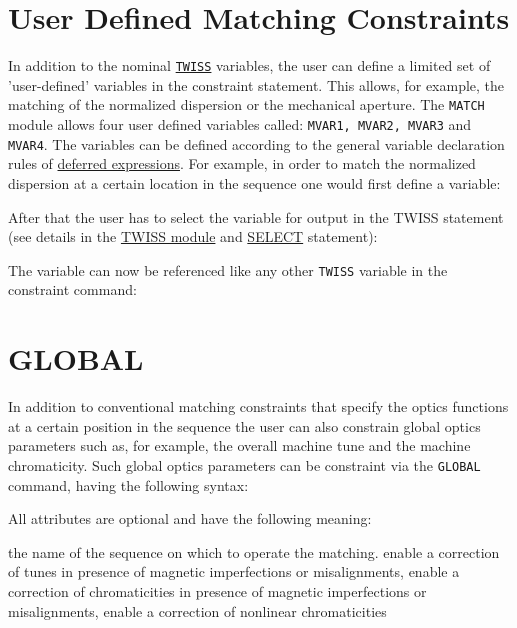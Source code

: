 \section{User Defined Matching Constraints}
\label{sec:userconstraint}

In addition to the nominal \hyperref[chap:twiss]{\tt TWISS} variables, 
the user can define a limited
set of 'user-defined' variables in the constraint statement. This
allows, for example, the matching of the normalized dispersion or the
mechanical aperture. The {\tt MATCH} module allows four user defined variables
called: {\tt MVAR1, MVAR2, MVAR3} and {\tt MVAR4}. 
The variables can be defined according to the general variable
declaration rules of \hyperref[sec:defer]{deferred expressions}.
For example, in order to match the normalized dispersion at a certain
location in the sequence one would first define a variable:


After that the user has to select the variable for output in the TWISS
statement (see details in the \hyperref[chap:twiss]{TWISS module} and 
\hyperref[sec:select]{SELECT} statement):

The variable can now be referenced like any other {\tt TWISS} variable
in the constraint command:

\section{GLOBAL}
\label{sec:global}

In addition to conventional matching constraints that specify the optics 
functions at a certain position in the sequence the user can also constrain 
global optics parameters such as, for example, the overall machine tune
and the machine chromaticity. Such global optics parameters can be
constraint via the {\tt GLOBAL} command, having the following syntax:



All attributes are optional and have the following meaning:
\begin{madlist}
   the name of the sequence on which to operate the matching.
   enable a correction of tunes in presence of
  magnetic imperfections or misalignments, 
  enable a correction of chromaticities in presence of
  magnetic imperfections or misalignments, 
   enable a correction of nonlinear chromaticities
\end{madlist}


